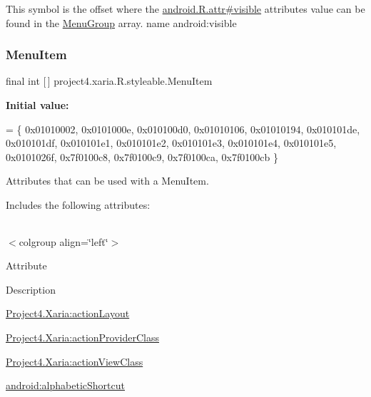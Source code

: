 This symbol is the offset where the \hyperlink{}{android.\+R.\+attr\#visible} attribute\textquotesingle{}s value can be found in the \hyperlink{classproject4_1_1xaria_1_1R_1_1styleable_ae48043cd359a2d376fa65b4af13eca9a}{Menu\+Group} array.  name android\+:visible \mbox{\label{classproject4_1_1xaria_1_1R_1_1styleable_a8a573827fcaba6497e560662224b5530}} 
\subsubsection{\texorpdfstring{Menu\+Item}{MenuItem}}
{\footnotesize\ttfamily final int \mbox{[}$\,$\mbox{]} project4.\+xaria.\+R.\+styleable.\+Menu\+Item\hspace{0.3cm}{\ttfamily [static]}}

{\bfseries Initial value\+:}
\begin{DoxyCode}
= \{
            0x01010002, 0x0101000e, 0x010100d0, 0x01010106,
            0x01010194, 0x010101de, 0x010101df, 0x010101e1,
            0x010101e2, 0x010101e3, 0x010101e4, 0x010101e5,
            0x0101026f, 0x7f0100c8, 0x7f0100c9, 0x7f0100ca,
            0x7f0100cb
        \}
\end{DoxyCode}
Attributes that can be used with a Menu\+Item. 

Includes the following attributes\+:

\tabulinesep=1mm
\begin{longtabu} spread 0pt [c]{*{0}{|X[-1]}|}
\hline
\end{longtabu}
$<$colgroup align=\char`\"{}left\char`\"{}$>$ 

Attribute

Description 

{\ttfamily \hyperlink{classproject4_1_1xaria_1_1R_1_1styleable_a1915ac7c3d21f624b8be98708d0a6d98}{Project4.\+Xaria\+:action\+Layout}}

{\ttfamily \hyperlink{classproject4_1_1xaria_1_1R_1_1styleable_a93fe7ce7481403c9886e9ee5cc2e76b7}{Project4.\+Xaria\+:action\+Provider\+Class}}

{\ttfamily \hyperlink{classproject4_1_1xaria_1_1R_1_1styleable_a7bbb347655e3e3a9ddf30dbb7bcc6a18}{Project4.\+Xaria\+:action\+View\+Class}}

{\ttfamily \hyperlink{classproject4_1_1xaria_1_1R_1_1styleable_aeb141859a1dafcfccfcc8935ac95cc18}{android\+:alphabetic\+Shortcut}}

